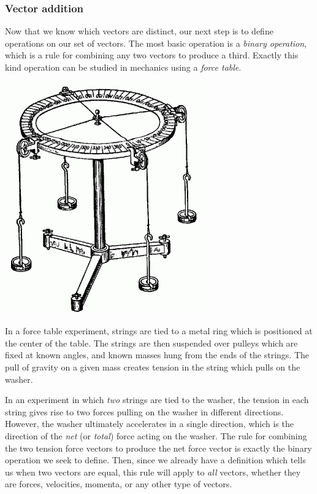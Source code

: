 \documentclass[12pt,letterpaper,reqno]{article}
\numberwithin{equation}{section}
\newcommand{\ti}[1]{\textit{#1}}
\begin{document}
\subsubsection{Vector addition}
Now that we know which vectors are distinct, our next step is to define operations on our set of vectors. The most basic operation is a \ti{binary operation}, which is a rule for combining any two vectors to produce a third. Exactly this kind operation can be studied in mechanics using a \ti{force table}.

\begin{center}
	\includegraphics[scale=0.5]{figures_mvc/force_table_experiment_2}
\end{center}

In a force table experiment, strings are tied to a metal ring which is positioned at the center of the table. The strings are then suspended over pulleys which are fixed at known angles, and known masses hung from the ends of the strings. The pull of gravity on a given mass creates tension in the string which pulls on the washer. 

In an experiment in which \ti{two} strings are tied to the washer, the tension in each string gives rise to two forces pulling on the washer in different directions. However, the washer ultimately accelerates in a single direction, which is the direction of the \ti{net} (or \ti{total}) force acting on the washer. The rule for combining the two tension force vectors to produce the net force vector is exactly the binary operation we seek to define. Then, since we already have a definition which tells us when two vectors are equal, this rule will apply to \ti{all} vectors, whether they are forces, velocities, momenta, or any other type of vectors. 
\end{document}
